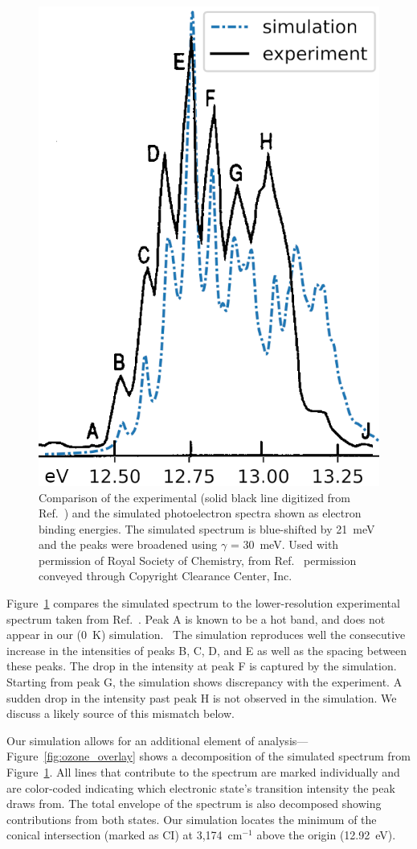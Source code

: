 \documentclass[12pt,prb,aps]{revtex4}
\begin{document}
\begin{figure}
\includegraphics[width = 8 cm]{figures/sim_vs_Dyke.png}
\caption{
    Comparison of the experimental (solid black line digitized from Ref.~) and the simulated
    photoelectron spectra shown as electron binding energies.
    The simulated spectrum is blue-shifted by 21~meV and the peaks were broadened using  $\gamma$ = 30~meV.
    Used with permission of Royal Society of Chemistry, from Ref.~ permission conveyed through Copyright Clearance Center, Inc.
\label{fig:sim_vs_dyke}}
\end{figure}


Figure~\ref{fig:sim_vs_dyke} compares the simulated spectrum to the
lower-resolution experimental spectrum taken from Ref.~. 
Peak A is
known to be a hot band, and does not appear in our (0~K)
simulation.~\cite{KDC:O3:92} The simulation reproduces well the consecutive
increase in the intensities of peaks B, C, D, and E as well as the spacing between these peaks. The drop in the intensity at peak F is
captured by the simulation. Starting from peak G, the simulation shows
discrepancy with the experiment. A sudden drop in the intensity past peak
H is not observed in the simulation. We discuss a likely source of this mismatch below.

Our simulation allows
for an additional element of analysis---Figure~\ref{fig:ozone_overlay} shows a decomposition of the simulated spectrum from Figure~\ref{fig:sim_vs_dyke}. 
All lines that contribute to the
spectrum are marked individually and are color-coded indicating which
electronic state's transition intensity the peak draws from. The total
envelope of the spectrum is also decomposed showing contributions from both
states. Our simulation locates the minimum of the conical intersection (marked as CI) at 3,174~cm$^{-1}$ above the origin (12.92~eV). 
\end{document}
